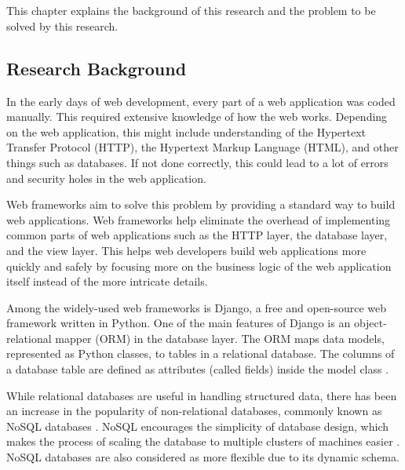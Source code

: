 \chapter{\babSatu}

This chapter explains the background of this research and the problem to be
solved by this research.

\section{Research Background}

In the early days of web development, every part of a web application was coded
manually. This required extensive knowledge of how the web works. Depending on
the web application, this might include understanding of the Hypertext Transfer
Protocol (HTTP), the Hypertext Markup Language (HTML), and other things such as
databases. If not done correctly, this could lead to a lot of errors and
security holes in the web application.

Web frameworks aim to solve this problem by providing a standard way to build
web applications. Web frameworks help eliminate the overhead of implementing
common parts of web applications such as the HTTP layer, the database layer,
and the view layer. This helps web developers build web applications more
quickly and safely by focusing more on the business logic of the web
application itself instead of the more intricate details.

Among the widely-used web frameworks is Django, a free and open-source web
framework written in Python. One of the main features of Django is an
object-relational mapper (ORM) in the database layer. The ORM maps data models,
represented as Python classes, to tables in a relational database. The columns
of a database table are defined as attributes (called fields) inside the model
class \cite{django}.

While relational databases are useful in handling structured data, there has
been an increase in the popularity of non-relational databases, commonly known
as NoSQL databases \cite{paul_nosql}. NoSQL encourages the simplicity of
database design, which makes the process of scaling the database to multiple
clusters of machines easier \cite{leavitt_nosql}. NoSQL databases are also
considered as more flexible due to its dynamic schema.

